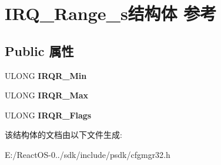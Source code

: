 \hypertarget{struct_i_r_q___range__s}{}\section{I\+R\+Q\+\_\+\+Range\+\_\+s结构体 参考}
\label{struct_i_r_q___range__s}
\subsection*{Public 属性}
\begin{DoxyCompactItemize}
\item 
\mbox{\label{struct_i_r_q___range__s_ac82d9b0161b7e058836b892b04f82dc7}} 
U\+L\+O\+NG {\bfseries I\+R\+Q\+R\+\_\+\+Min}
\item 
\mbox{\label{struct_i_r_q___range__s_a02c2884c665e1b4ab5b6088fcc767b84}} 
U\+L\+O\+NG {\bfseries I\+R\+Q\+R\+\_\+\+Max}
\item 
\mbox{\label{struct_i_r_q___range__s_aaa618b3c6d39708492ee51e0aa5724cb}} 
U\+L\+O\+NG {\bfseries I\+R\+Q\+R\+\_\+\+Flags}
\end{DoxyCompactItemize}


该结构体的文档由以下文件生成\+:\begin{DoxyCompactItemize}
\item 
E\+:/\+React\+O\+S-\/0../sdk/include/psdk/cfgmgr32.\+h\end{DoxyCompactItemize}
